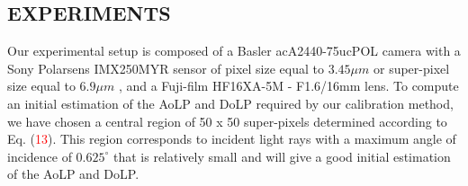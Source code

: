 \documentclass[10pt,twocolumn,letterpaper]{article}
\begin{document}
\subsection{EXPERIMENTS}

Our experimental setup is composed of a Basler acA2440-75ucPOL camera with a Sony Polarsens IMX250MYR sensor of pixel size equal to $3.45\mu m$ or super-pixel size equal to $6.9\mu m$ , and a Fuji-film HF16XA-5M - F1.6/16mm lens. To compute an initial estimation of the AoLP and DoLP required by our calibration method, we have chosen a central region of 50 x 50 super-pixels determined according to Eq. (\textcolor{red}{13}). This region corresponds to incident light rays with a maximum angle of incidence of $0.625^{\circ}$ that is relatively small and will give a good initial estimation of the AoLP and DoLP.
\end{document}
